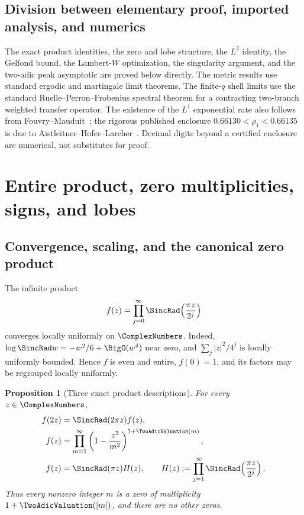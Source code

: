 \documentclass[11pt,oneside]{article}
\newtheorem{proposition}[theorem]{Proposition}
\theoremstyle{definition}
\theoremstyle{remark}
\begin{document}
\subsection{Division between elementary proof, imported analysis, and numerics}

The exact product identities, the zero and lobe structure, the $L^2$ identity,
the Gelfond bound, the Lambert-$W$ optimization, the singularity argument, and
the two-adic peak asymptotic are proved below directly.  The metric results use
standard ergodic and martingale limit theorems.  The finite-$q$ shell limits use
the standard Ruelle--Perron--Frobenius spectral theorem for a contracting
two-branch weighted transfer operator.  The existence of the $L^1$ exponential
rate also follows from Fouvry--Mauduit~\cite{fouvrymauduit}; the rigorous
published enclosure $0.66130<\rho_1<0.66135$ is due to
Aistleitner--Hofer--Larcher~\cite{ahl2017}.  Decimal digits beyond a certified
enclosure are numerical, not substitutes for proof.

\section{Entire product, zero multiplicities, signs, and lobes}
\label{sec:product}

\subsection{Convergence, scaling, and the canonical zero product}

The infinite product
\begin{equation}
 f(z)=\prod_{j=0}^{\infty}\SincRad\!\left(\frac{\pi z}{2^j}\right)
 \label{eq:f-def}
\end{equation}
converges locally uniformly on $\ComplexNumbers$.  Indeed,
$\log\SincRad w=-w^2/6+\BigO(w^4)$ near zero, and
$\sum_j|z|^2/4^j$ is locally uniformly bounded.  Hence $f$ is even and entire,
$f(0)=1$, and its factors may be regrouped locally uniformly.

\begin{proposition}[Three exact product descriptions]
\label{prop:products}
For every $z\in\ComplexNumbers$,
\begin{align}
 f(2z)&=\SincRad(2\pi z)f(z),
 \label{eq:dilation}\\
 f(z)&=\prod_{m=1}^{\infty}
 \left(1-\frac{z^2}{m^2}\right)^{1+\TwoAdicValuation(m)},
 \label{eq:weierstrass}\\
 f(z)&=\SincRad(\pi z)H(z),
 \qquad
 H(z):=\prod_{j=1}^{\infty}\SincRad\!\left(\frac{\pi z}{2^j}\right).
 \label{eq:H-def}
\end{align}
Thus every nonzero integer $m$ is a zero of multiplicity $1+\TwoAdicValuation(|m|)$,
and there are no other zeros.
\end{proposition}
\end{document}
